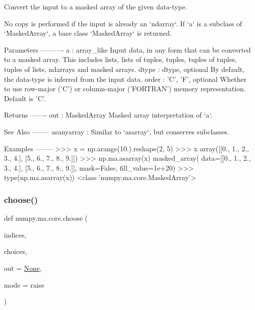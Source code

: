 \begin{DoxyVerb}Convert the input to a masked array of the given data-type.

No copy is performed if the input is already an `ndarray`. If `a` is
a subclass of `MaskedArray`, a base class `MaskedArray` is returned.

Parameters
----------
a : array_like
    Input data, in any form that can be converted to a masked array. This
    includes lists, lists of tuples, tuples, tuples of tuples, tuples
    of lists, ndarrays and masked arrays.
dtype : dtype, optional
    By default, the data-type is inferred from the input data.
order : {'C', 'F'}, optional
    Whether to use row-major ('C') or column-major ('FORTRAN') memory
    representation.  Default is 'C'.

Returns
-------
out : MaskedArray
    Masked array interpretation of `a`.

See Also
--------
asanyarray : Similar to `asarray`, but conserves subclasses.

Examples
--------
>>> x = np.arange(10.).reshape(2, 5)
>>> x
array([[0., 1., 2., 3., 4.],
       [5., 6., 7., 8., 9.]])
>>> np.ma.asarray(x)
masked_array(
  data=[[0., 1., 2., 3., 4.],
        [5., 6., 7., 8., 9.]],
  mask=False,
  fill_value=1e+20)
>>> type(np.ma.asarray(x))
<class 'numpy.ma.core.MaskedArray'>\end{DoxyVerb}
 \mbox{\label{namespacenumpy_1_1ma_1_1core_ac77f54658f39f9a0deae59feb9f8c50b}} 
\subsubsection{\texorpdfstring{choose()}{choose()}}
{\footnotesize\ttfamily def numpy.\+ma.\+core.\+choose (\begin{DoxyParamCaption}\item[{}]{indices,  }\item[{}]{choices,  }\item[{}]{out = {\ttfamily \hyperlink{namespacenumpy_1_1ma_1_1core_a647ee1848dfa3692fe35a663a2aa40b3}{None}},  }\item[{}]{mode = {\ttfamily \textquotesingle{}raise\textquotesingle{}} }\end{DoxyParamCaption})}

